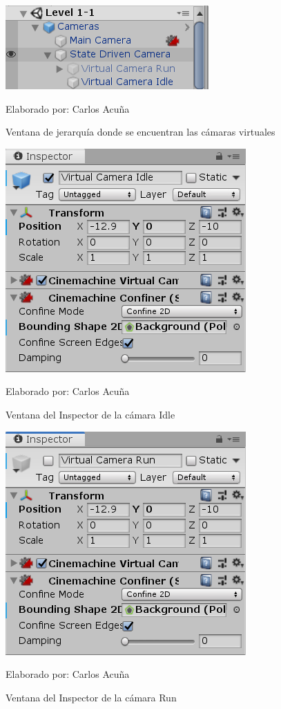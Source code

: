 \documentclass[a4paper, openright, 12pt]{report}
\begin{document}
\begin{figure}[h]
\captionsetup{justification=centering,margin=2cm}
\includegraphics[scale=1]{T04_01}
\centering
\caption{Ventana de jerarquía donde se encuentran las cámaras virtuales}
Elaborado por: Carlos Acuña
\label{fig:T04_01}
\end{figure}

\begin{figure}[h]
\captionsetup{justification=centering,margin=2cm}
\includegraphics[scale=1]{T04_02}
\centering
\caption{Ventana del Inspector de la cámara Idle}
Elaborado por: Carlos Acuña
\label{fig:T04_02}
\end{figure}

\begin{figure}[h]
\captionsetup{justification=centering,margin=2cm}
\includegraphics[scale=1]{T04_03}
\centering
\caption{Ventana del Inspector de la cámara Run}
Elaborado por: Carlos Acuña
\label{fig:T04_03}
\end{figure}
\clearpage
\end{document}
